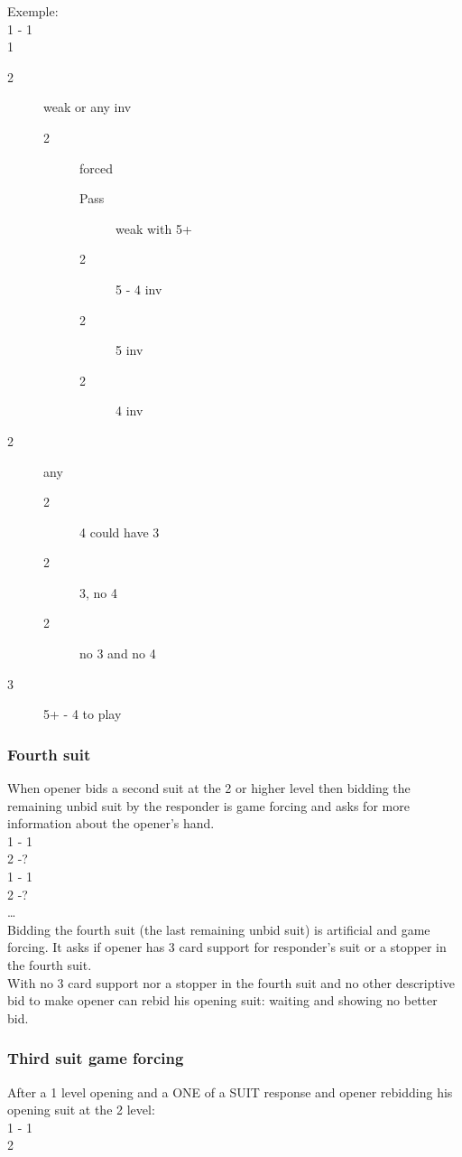 \documentclass[11pt]{article}
\begin{document}
Exemple:\\
1 - 1\\
1\\
\begin{description}
\item[{2}] weak or any inv
\begin{description}
\item[{2}] forced
\begin{description}
\item[{Pass}] weak with 5+
\item[{2}] 5 - 4 inv
\item[{2}] 5 inv
\item[{2}] 4 inv
\end{description}
\end{description}
\item[{2}] any 
\begin{description}
\item[{2}] 4 could have 3
\item[{2}] 3, no 4
\item[{2}] no 3 and no 4
\end{description}
\item[{3}] 5+ - 4 to play
\end{description}
\subsubsection*{Fourth suit }
\label{sec:org3e8d840}
When opener bids a second suit at the 2 or higher level then bidding the remaining unbid suit by the responder is game forcing and asks for more information about the opener’s hand.\\

1 - 1\\
2 -? \\

1 - 1\\
2 -? \\
… \\

Bidding the fourth suit (the last remaining unbid suit) is artificial and game forcing. It asks if opener has 3 card support for responder’s suit or a stopper in the fourth suit. \\
With no 3 card support nor a stopper in the fourth suit and no other descriptive bid to make opener can rebid his opening suit: waiting and showing no better bid. \\
\subsubsection*{Third suit game forcing}
\label{sec:org390cb94}
After a 1 level opening and a ONE of a SUIT response and opener rebidding his opening suit at the 2 level:\\
1 - 1\\
2\\
\end{document}
